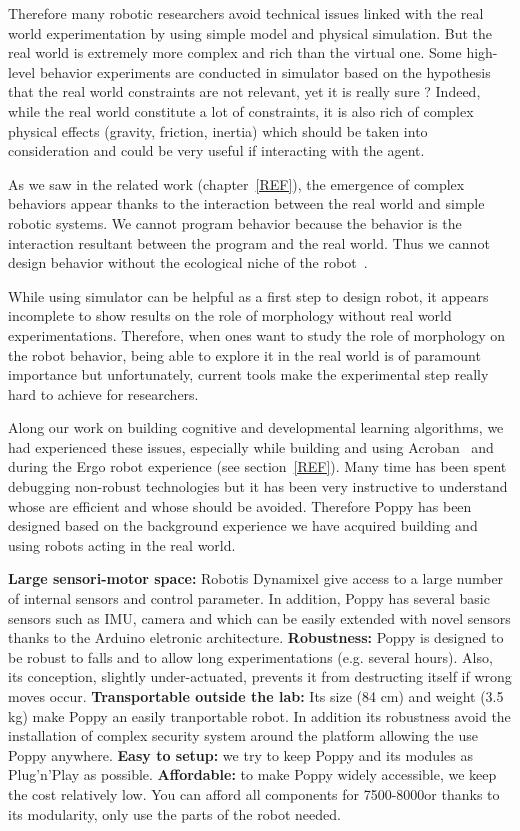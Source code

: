 Therefore many robotic researchers avoid technical issues linked with the real world experimentation by using simple model and physical simulation. But the real world is extremely more complex and rich than the virtual one.
Some high-level behavior experiments are conducted in simulator based on the hypothesis that the real world constraints are not relevant, yet it is really sure ?
Indeed, while the real world constitute a lot of constraints, it is also rich of complex physical effects (gravity, friction, inertia) which should be taken into consideration and could be very useful if interacting with the agent.

As we saw in the related work (chapter~\ref{REF}), the emergence of complex behaviors appear thanks to the interaction between the real world and simple robotic systems. We cannot program behavior because the behavior is the interaction resultant between the program and the real world. Thus we cannot design behavior without the ecological niche of the robot~\cite{Steels1991emergence}.

While using simulator can be helpful as a first step to design robot, it appears incomplete to show results on the role of morphology without real world experimentations.
Therefore, when ones want to study the role of morphology on the robot behavior, being able to explore it in the real world is of paramount importance but unfortunately, current tools make the experimental step really hard to achieve for researchers.

Along our work on building cognitive and developmental learning algorithms, we had experienced these issues, especially while building and using Acroban~\cite{Ly2010} and during the Ergo robot experience (see section~\ref{REF}). Many time has been spent debugging non-robust technologies but it has been very instructive to understand whose are efficient and whose should be avoided. Therefore Poppy has been designed based on the background experience we have acquired building and using robots acting in the real world.

\textbf{Large sensori-motor space:} Robotis Dynamixel give access to a large number of internal sensors and control parameter. In addition, Poppy has several basic sensors such as IMU, camera and which can be easily extended with novel sensors thanks to the Arduino eletronic architecture.
\textbf{Robustness:} Poppy is designed to be robust to falls and to allow long experimentations (e.g. several hours). Also, its conception, slightly under-actuated, prevents it from destructing itself if wrong moves occur.
\textbf{Transportable outside the lab:} Its size (84 cm) and weight (3.5 kg) make Poppy an easily tranportable robot. In addition its robustness avoid the installation of complex security system around the platform allowing the use Poppy anywhere.
\textbf{Easy to setup:} we try to keep Poppy and its modules as Plug’n'Play as possible.
\textbf{Affordable:} to make Poppy widely accessible, we keep the cost relatively low. You can afford all components for 7500-8000\texteuro or thanks to its modularity, only use the parts of the robot needed.


